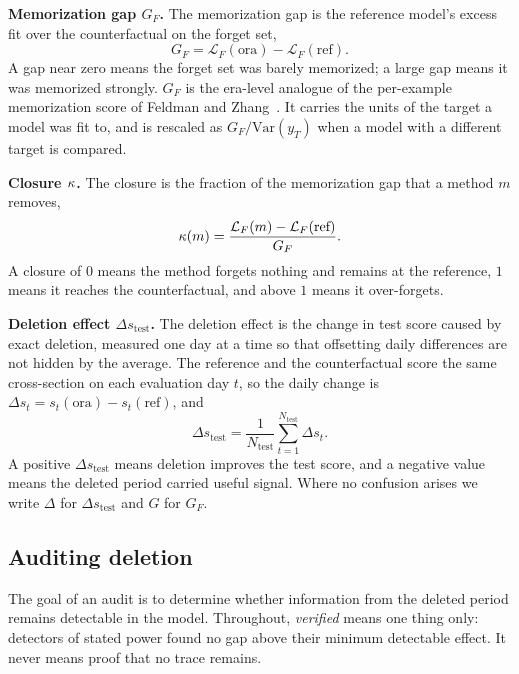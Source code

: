 \textbf{Memorization gap $G_F$.} The memorization gap is the reference
model's excess fit over the counterfactual on the forget set,
\begin{equation}
G_F = \mathcal{L}_F(\text{ora}) - \mathcal{L}_F(\text{ref}).
\label{eq:gap}
\end{equation}
A gap near zero means the forget set was barely memorized; a large gap
means it was memorized strongly. $G_F$ is the era-level analogue of the per-example memorization
score of Feldman and Zhang~\cite{feldman2020what}. It carries the
units of the target a model was fit to, and is rescaled as
$G_F/\mathrm{Var}(y_T)$ when a model with a different target is
compared.

\textbf{Closure $\kappa$.} The closure is the fraction of the
memorization gap that a method $m$ removes,
\begin{equation}
\kappa(m) =
\frac{\mathcal{L}_F(m) - \mathcal{L}_F(\text{ref})}{G_F}.
\label{eq:kappa}
\end{equation}
A closure of $0$ means the method forgets nothing and remains at the
reference, $1$ means it reaches the counterfactual, and above $1$
means it over-forgets.

\textbf{Deletion effect $\Delta s_{\text{test}}$.} The deletion effect
is the change in test score caused by exact deletion, measured one day
at a time so that offsetting daily differences are not hidden by the
average. The reference and the counterfactual score the same
cross-section on each evaluation day $t$, so the daily change is
$\Delta s_t = s_t(\text{ora}) - s_t(\text{ref})$, and
\begin{equation}
\Delta s_{\text{test}} =
\frac{1}{N_{\text{test}}}\sum_{t=1}^{N_{\text{test}}} \Delta s_t .
\label{eq:delta}
\end{equation}
A positive $\Delta s_{\text{test}}$ means deletion improves the
test score, and a negative value means the deleted period carried
useful signal. Where no confusion arises we write $\Delta$ for
$\Delta s_{\text{test}}$ and $G$ for $G_F$.

\subsection{Auditing deletion}

The goal of an audit is to determine whether information from the
deleted period remains detectable in the model. Throughout,
\emph{verified} means one thing only: detectors of stated power found
no gap above their minimum detectable effect. It never means proof
that no trace remains.

